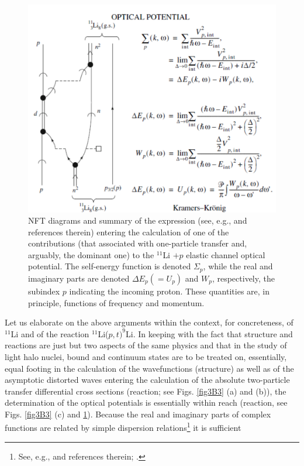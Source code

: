 \begin{figure}
\centerline{\includegraphics*[width=15cm,angle=0]{nutshell/figs/fig3B4.pdf}}
\caption{NFT diagrams and summary of the expression (see, e.g., \cite{Mahaux:85} and references therein) entering the calculation of one of
the contributions (that associated with one-particle transfer and, arguably, the dominant one) to the $^{11}$Li $+ p$ elastic channel
optical potential. The self-energy function is denoted $\Sigma_p$, while the real and imaginary parts are denoted $\Delta E_p (=U_p)$ and $W_p$,
respectively, the subindex $p$ indicating the incoming proton. These quantities are, in principle, functions of frequency and
momentum.}\label{fig3B4}
\end{figure}
Let us elaborate on the above arguments within the context, for concreteness, of $^{11}$Li and of the reaction $^{11}$Li($p,t)^9$Li. In keeping with the fact that structure and reactions
are just but two aspects of the same physics
and that in the study of light halo nuclei, bound and continuum
states are to be treated on, essentially, equal footing
in the calculation of the wavefunctions  (structure) as well as of the asymptotic
distorted waves entering  the calculation of the absolute
two-particle transfer differential cross sections
(reaction; see Figs. \ref{fig3B3} (a) and (b)), the determination
of the optical potentials is essentially within reach
(reaction, see Figs. \ref{fig3B3} (c) and \ref{fig3B4}).
Because the real and imaginary parts of complex
functions are related by simple dispersion relations\footnote{See, e.g., \cite{Mahaux:85} and references therein; \cite{Dickhoff:05}.} it is sufficient
